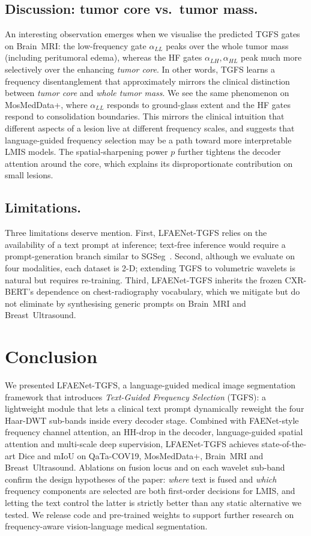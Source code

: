 \documentclass[runningheads]{llncs}
\newcommand{\method}{LFAENet-TGFS\xspace}
\newcommand{\tgfs}{TGFS\xspace}
\begin{document}
\subsection{Discussion: tumor core vs.\ tumor mass.}
\label{sec:discussion}
An interesting observation emerges when we visualise the predicted
\tgfs gates on Brain~MRI: the low-frequency gate $\alpha_{LL}$
peaks over the whole tumor mass (including peritumoral edema),
whereas the HF gates $\alpha_{LH},\alpha_{HL}$ peak much more
selectively over the enhancing \emph{tumor core}. In other words,
\tgfs learns a frequency disentanglement that approximately mirrors
the clinical distinction between \emph{tumor core} and \emph{whole
tumor mass}. We see the same phenomenon on MosMedData+, where
$\alpha_{LL}$ responds to ground-glass extent and the HF gates
respond to consolidation boundaries. This mirrors the clinical
intuition that different aspects of a lesion live at different
frequency scales, and suggests that language-guided frequency
selection may be a path toward more interpretable LMIS models. The
spatial-sharpening power $p$ further tightens the decoder attention
around the core, which explains its disproportionate contribution
on small lesions.

\subsection{Limitations.}
Three limitations deserve mention. First, \method relies on the
availability of a text prompt at inference; text-free inference
would require a prompt-generation branch similar to
SGSeg~\cite{ye2024sgseg}. Second, although we evaluate on four
modalities, each dataset is 2-D; extending \tgfs to volumetric
wavelets is natural but requires re-training. Third, \method
inherits the frozen CXR-BERT's dependence on chest-radiography
vocabulary, which we mitigate but do not eliminate by synthesising
generic prompts on Brain~MRI and Breast~Ultrasound.

\section{Conclusion}
\label{sec:conclusion}
We presented \method, a language-guided medical image segmentation
framework that introduces \emph{Text-Guided Frequency Selection}
(\tgfs): a lightweight module that lets a clinical text prompt
dynamically reweight the four Haar-DWT sub-bands inside every
decoder stage. Combined with FAENet-style frequency channel
attention, an HH-drop in the decoder, language-guided spatial
attention and multi-scale deep supervision, \method achieves
state-of-the-art Dice and mIoU on QaTa-COV19, MosMedData+,
Brain~MRI and Breast~Ultrasound. Ablations on fusion locus and on
each wavelet sub-band confirm the design hypotheses of the paper:
\emph{where} text is fused and \emph{which} frequency components
are selected are both first-order decisions for LMIS, and letting
the text control the latter is strictly better than any static
alternative we tested. We release code and pre-trained weights to
support further research on frequency-aware vision-language
medical segmentation.
\end{document}
